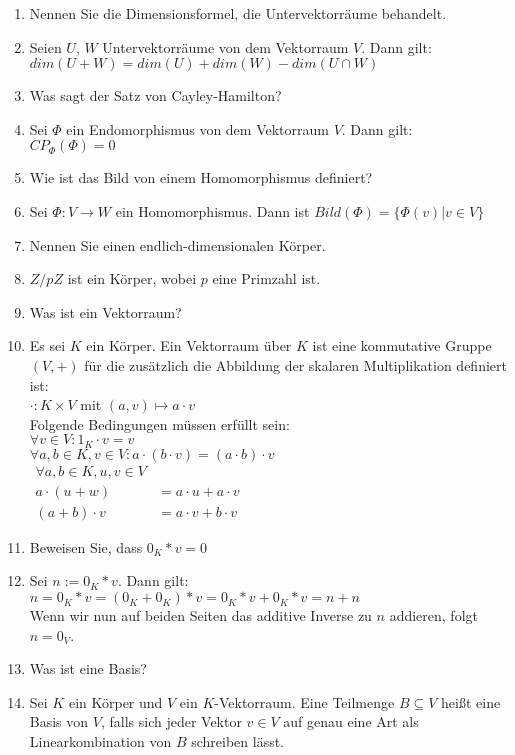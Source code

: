 \documentclass[11pt,parskip=full]{scrartcl}
\newcommand{\answer}{\item[\textbf{Antwort}]}
\begin{document}
\begin{enumerate}[label=\textbf{\arabic*. Frage}]
		\item Nennen Sie die Dimensionsformel, die Untervektorräume behandelt.
		\answer Seien $U$, $W$ Untervektorräume von dem Vektorraum $V$. Dann gilt:\\
		\(dim(U+W) = dim(U) + dim(W) - dim(U \cap W)\)
		
		\item Was sagt der Satz von Cayley-Hamilton?
		\answer Sei $\Phi$ ein Endomorphismus von dem Vektorraum $V$. Dann gilt:\\
		\(CP_{\Phi}(\Phi) = 0\)
		
		\item Wie ist das Bild von einem Homomorphismus definiert?
		\answer Sei \(\Phi: V \rightarrow W\) ein Homomorphismus. Dann ist \(Bild(\Phi) = \{\Phi(v) | v \in V\}\)
		
		\item Nennen Sie einen endlich-dimensionalen Körper.
		\answer \(Z/pZ\) ist ein Körper, wobei $p$ eine Primzahl ist.
		
		\item Was ist ein Vektorraum?
		\answer Es sei $K$ ein Körper. Ein Vektorraum über $K$ ist eine kommutative Gruppe \((V, +)\) für die zusätzlich die Abbildung der skalaren Multiplikation definiert ist:\\
		\(\cdot: K \times V\) mit \((a, v) \mapsto a \cdot v\)\\
		Folgende Bedingungen müssen erfüllt sein:\\
		\(\forall v \in V: 1_K \cdot v = v\)\\
		\(\forall a,b \in K, v \in V: a \cdot (b \cdot v) = (a \cdot b) \cdot v\)\\
		\(\begin{aligned} \forall a,b \in K, u,v \in V &\\
		a \cdot (u + w) &= a \cdot u + a \cdot v\\
		(a + b) \cdot v &= a \cdot v + b \cdot v
		\end{aligned}\)
		
		\item Beweisen Sie, dass \(0_K * v = 0\)
		\answer Sei \(n := 0_K * v\). Dann gilt:\\
		\(n = 0_K * v = (0_K + 0_K) * v = 0_K * v + 0_K * v = n + n\)\\
		Wenn wir nun auf beiden Seiten das additive Inverse zu $n$ addieren, folgt \(n = 0_V\).
				
		\item Was ist eine Basis?
		\answer Sei $K$ ein Körper und $V$ ein $K$-Vektorraum. Eine Teilmenge \(B \subseteq V\) heißt eine Basis von $V$, falls sich jeder Vektor \(v \in V\) auf genau eine Art als Linearkombination von $B$ schreiben lässt.
		

\end{enumerate}
\end{document}

